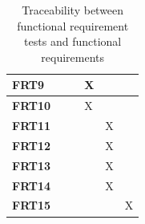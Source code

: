 \documentclass[12pt, titlepage]{article}
\begin{document}
\begin{table}[H]
\begin{tabular}{|l|lllll|}
  \textbf{FRT9}  & \multicolumn{1}{l|}{}             & \multicolumn{1}{l|}{}             & \multicolumn{1}{l|}{X}            & \multicolumn{1}{l|}{}             &              \\ \hline
  \textbf{FRT10} & \multicolumn{1}{l|}{}             & \multicolumn{1}{l|}{}             & \multicolumn{1}{l|}{X}            & \multicolumn{1}{l|}{}             &              \\ \hline
  \textbf{FRT11} & \multicolumn{1}{l|}{}             & \multicolumn{1}{l|}{}             & \multicolumn{1}{l|}{}             & \multicolumn{1}{l|}{X}            &              \\ \hline
  \textbf{FRT12} & \multicolumn{1}{l|}{}             & \multicolumn{1}{l|}{}             & \multicolumn{1}{l|}{}             & \multicolumn{1}{l|}{X}            &              \\ \hline
  \textbf{FRT13} & \multicolumn{1}{l|}{}             & \multicolumn{1}{l|}{}             & \multicolumn{1}{l|}{}             & \multicolumn{1}{l|}{X}            &              \\ \hline
  \textbf{FRT14} & \multicolumn{1}{l|}{}             & \multicolumn{1}{l|}{}             & \multicolumn{1}{l|}{}             & \multicolumn{1}{l|}{X}            &              \\ \hline
  \textbf{FRT15} & \multicolumn{1}{l|}{}             & \multicolumn{1}{l|}{}             & \multicolumn{1}{l|}{}             & \multicolumn{1}{l|}{}             & X            \\ \hline
  \end{tabular}
  \caption{Traceability between functional requirement tests and functional requirements }
  \label{tab:my-table}
\end{table}
\end{document}
